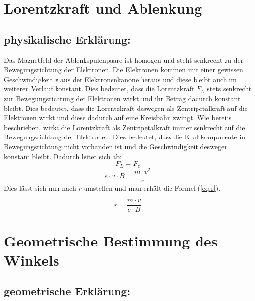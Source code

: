 \section{Lorentzkraft und Ablenkung}

\subsection{physikalische Erklärung:}

Das Magnetfeld der Ablenkspulenpaare ist homogen und steht senkrecht zu der Bewegungsrichtung der Elektronen.
Die Elektronen kommen mit einer gewissen Geschwindigkeit $v$ aus der Elektronenkanone heraus und diese bleibt auch im weiteren Verlauf konstant.
Dies bedeutet, dass die Lorentzkraft $F_L$ stets senkrecht zur Bewegungsrichtung der Elektronen wirkt und ihr Betrag dadurch konstant bleibt.
Dies bedeutet, dass die Lorentzkraft deswegen als Zentripetalkraft auf die Elektronen wirkt und diese dadurch auf eine Kreisbahn zwingt.
Wie bereits beschrieben, wirkt die Lorentzkraft als Zentripetalkraft immer senkrecht auf die Bewegungsrichtung der Elektronen.
Dies bedeutet, dass die Kraftkomponente in Bewegungsrichtung nicht vorhanden ist und die Geschwindigkeit deswegen konstant bleibt.
Dadurch leitet sich ab: 
$$ F_L=F_z$$
$$ e \cdot v \cdot B = \frac{m \cdot v^2}{r}$$
Dies lässt sich nun nach $r$ umstellen und man erhält die Formel (\ref{eq:r}).   


\begin{equation}
     \label{eq:r}
     r = \frac{m \cdot v}{e \cdot B}
\end{equation}

\section{Geometrische Bestimmung des Winkels}

\subsection{geometrische Erklärung:}

